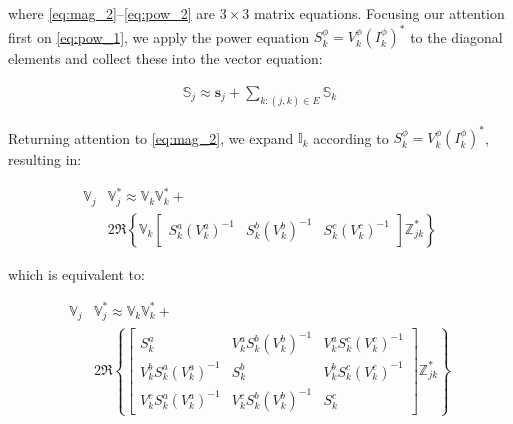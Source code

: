 \noindent where \eqref{eq:mag_2}--\eqref{eq:pow_2} are $3\times 3$ matrix equations. Focusing our attention first on \eqref{eq:pow_1}, we apply the power equation $S_{k}^{\phi} = V_{k}^{\phi} (I_{k}^{\phi})^{*}$ to the diagonal elements and collect these into the vector equation:

\begin{align}
	\mathbb{S}_{j} \approx \mathbf{s}_{j} + \sum_{k:(j,k) \in E} \mathbb{S}_{k} \label{eq:pow_3}
\end{align}

Returning attention to \eqref{eq:mag_2}, we expand $\mathbb{I}_{k}$ according to $S_{k}^{\phi} = V_{k}^{\phi} (I_{k}^{\phi})^{*}$, resulting in:

\begin{equation}
	\begin{aligned}
		\mathbb{V}_{j} & \mathbb{V}_{j}^{*} \approx \mathbb{V}_{k} \mathbb{V}_{k}^{*} + \\
    	& 2 \Re \left\{ \mathbb{V}_{k}
    	\begin{bmatrix}
    		S_{k}^{a} (V_{k}^{a})^{-1} & S_{k}^{b} (V_{k}^{b})^{-1} & S_{k}^{c} (V_{k}^{c})^{-1}
    	\end{bmatrix}
    	\mathbb{Z}_{jk}^* \right\}
    \end{aligned}
    \label{eq:mag_3}
\end{equation}

\noindent which is equivalent to:


\begin{equation}
	\begin{aligned}
		\mathbb{V}_{j} & \mathbb{V}_{j}^{*} \approx \mathbb{V}_{k} \mathbb{V}_{k}^{*} + \\
    	& 2 \Re \left\{
    	\begin{bmatrix}
    		S_{k}^{a} & V_{k}^{a} S_{k}^{b} (V_{k}^{b})^{-1} & V_{k}^{a} S_{k}^{c} (V_{k}^{c})^{-1} \\
    		V_{k}^{b} S_{k}^{a} (V_{k}^{a})^{-1} & S_{k}^{b} & V_{k}^{b} S_{k}^{c} (V_{k}^{c})^{-1} \\
    		V_{k}^{c} S_{k}^{a} (V_{k}^{a})^{-1} & V_{k}^{c} S_{k}^{b} (V_{k}^{b})^{-1} & S_{k}^{c}
    	\end{bmatrix}
    	\mathbb{Z}_{jk}^* \right\}
    \end{aligned}
    \label{eq:mag_4}
\end{equation}

